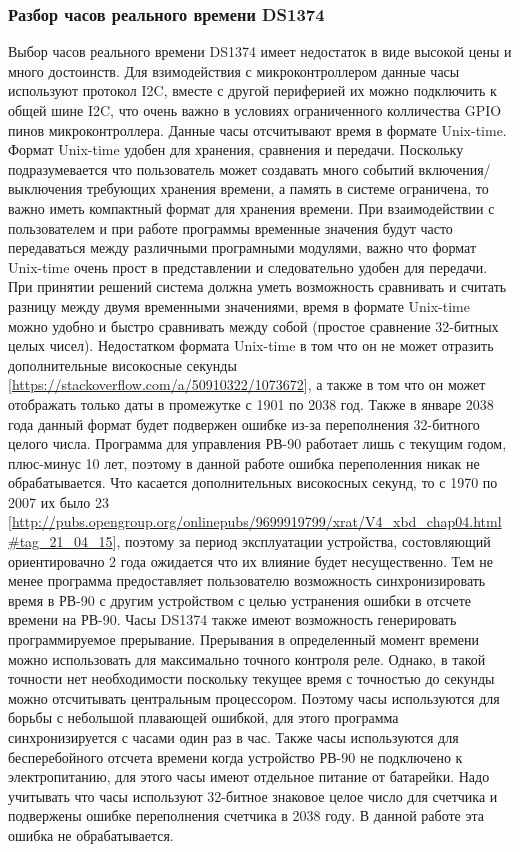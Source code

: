 \subsubsection{ Разбор часов реального времени DS1374 }
Выбор часов реального времени DS1374 имеет недостаток в виде высокой цены и много достоинств. 
Для взимодействия с микроконтроллером данные часы используют протокол I2C, вместе с другой периферией их можно подключить к общей шине I2C, что очень важно в условиях ограниченного колличества GPIO пинов  микроконтроллера.
Данные часы отсчитывают время в формате Unix-time. Формат Unix-time удобен для хранения, сравнения и передачи. Поскольку подразумевается что пользователь может создавать много событий включения/выключения требующих хранения времени, а память в системе ограничена, то важно иметь компактный формат для хранения времени. При взаимодействии с пользователем и при работе программы временные значения будут часто передаваться между различными програмными модулями, важно что формат Unix-time очень прост в представлении и следовательно удобен для передачи. При принятии решений система должна уметь возможность сравнивать и считать разницу между двумя временными значениями, время в формате Unix-time можно удобно и быстро сравнивать между собой (простое сравнение 32-битных целых чисел). Недостатком формата Unix-time в том что он не может отразить дополнительные високосные секунды [\url{https://stackoverflow.com/a/50910322/1073672}], а также в том что он может отображать только даты в промежутке с 1901 по 2038 год. Также в январе 2038 года данный формат будет подвержен ошибке из-за переполнения 32-битного целого числа. Программа для управления РВ-90 работает лишь с текущим годом, плюс-минус 10 лет, поэтому в данной работе ошибка переполенния никак не обрабатывается. Что касается дополнительных високосных секунд, то с 1970 по 2007 их было 23 [\url{http://pubs.opengroup.org/onlinepubs/9699919799/xrat/V4_xbd_chap04.html#tag_21_04_15}], поэтому за период эксплуатации устройства, состовляющий ориентировачно 2 года ожидается что их влияние будет несущественно. Тем не менее программа предоставляет пользователю возможность синхронизировать время в РВ-90 с другим устройством с целью устранения ошибки в отсчете времени на РВ-90. Часы DS1374 также имеют возможность генерировать программируемое прерывание.
Прерывания в определенный момент времени можно использовать для максимально точного контроля реле. Однако, в такой точности нет необходимости поскольку текущее время с точностью до секунды можно отсчитывать центральным процессором. Поэтому часы используются для борьбы с небольшой плавающей ошибкой, для этого программа синхронизируется с часами один раз в час. Также часы используются для бесперебойного отсчета времени когда устройство РВ-90 не подключено к электропитанию, для этого часы имеют отдельное питание от батарейки. Надо учитывать что часы используют 32-битное знаковое целое число для счетчика и подвержены ошибке переполнения счетчика в 2038 году. В данной работе эта ошибка не обрабатывается.  
